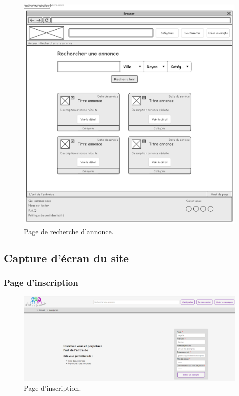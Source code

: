 \documentclass[a4paper,11pt]{article}
\begin{document}
\begin{figure}[H]
  \includegraphics[width=\linewidth]{images/maquette-recherche.png}
  \caption{Page de recherche d'annonce.}
  \label{fig:maquette-recherche}
\end{figure}
\newpage


\subsection{Capture d'écran du site}


\subsubsection{Page d'inscription}

\begin{figure}[H]
  \includegraphics[width=\linewidth]{images/page-inscription.png}
  \caption{Page d'inscription.}
  \label{fig:page-inscription}
\end{figure}
\end{document}
